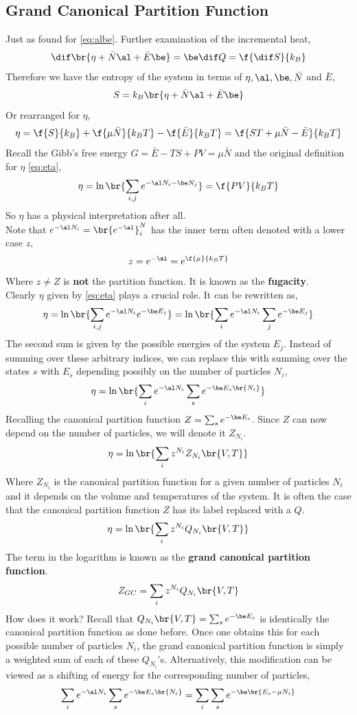 \documentclass{article}
\begin{document}
{\subsection{Grand Canonical Partition Function}
Just as found for \eqref{eq:albe}. Further examination of the incremental heat,
\[ \dif \br{\eta + \bar{N} \al + \bar{E} \be} = \be\dif Q = \f{\dif S}{k_B} \]
Therefore we have the entropy of the system in terms of $\eta, \al, \be, \bar{N}$ and $\bar{E}$,
\[ S = k_B \br{\eta + \bar{N} \al + \bar{E} \be} \]
Or rearranged for $\eta$,
\[ \eta = \f{S}{k_B} + \f{\mu\bar{N}}{k_B T} - \f{\bar{E}}{k_BT} = \f{ST + \mu\bar{N} - \bar{E}}{k_BT} \]
Recall the Gibb's free energy $G = \bar{E} - TS + PV = \mu \bar{N}$ and the original definition for $\eta$ \eqref{eq:eta},
\[ \eta = \ln \br{\sum_{i,j} e^{-\al N_i - \be N_j}} = \f{PV}{k_B T} \]
So $\eta$ has a physical interpretation after all. \\

Note that $e^{-\al N_i} = \br{e^{-\al}}^N_i$ has the inner term often denoted with a lower case $z$,
\[ z = e^{-\al} = e^{\f{\mu}{k_B T}}\]
Where $z \neq Z$ is \textbf{not} the partition function. It is known as the \textbf{fugacity}. \\

Clearly $\eta$ given by \eqref{eq:eta} plays a crucial role. It can be rewritten as,
\[ \eta  = \ln \br{\sum_{i,j} e^{-\al N_i} e^{-\be E_j}}  = \ln \br{\sum_{i} e^{-\al N_i} \sum_{j}e^{-\be E_j}} \]
The second sum is given by the possible energies of the system $E_j$. Instead of summing over these arbitrary indices, we can replace this with summing over the states $s$ with $E_s$ depending possibly on the number of particles $N_i$,
\[ \eta  = \ln \br{\sum_{i} e^{-\al N_i} \sum_{s}e^{-\be E_s\br{N_i}}} \]
Recalling the canonical partition function $Z = \sum_s e^{-\be E_s}$. Since $Z$ can now depend on the number of particles, we will denote it $Z_{N_i}$.
\[ \eta  = \ln \br{\sum_{i}z^{N_i} Z_{N_i} \br{V,T}} \]
Where $Z_{N_i}$ is the canonical partition function for a given number of particles $N_i$ and it depends on the volume and temperatures of the system. It is often the case that the canonical partition function $Z$ has its label replaced with a $Q$.
\[ \eta  = \ln \br{\sum_{i} z^{N_i} Q_{N_i} \br{V,T}} \]
The term in the logarithm is known as the \textbf{grand canonical partition function}.
\[ Z_{GC} = \sum_{i} z^{N_i} Q_{N_i} \br{V,T} \]
How does it work? Recall that $Q_{N_i} \br{V,T} = \sum_s e^{-\be E_s}$ is identically the canonical partition function as done before. Once one obtains this for each possible number of particles $N_i$, the grand canonical partition function is simply a weighted sum of each of these $Q_{N_i}$'s. Alternatively, this modification can be viewed as a shifting of energy for the corresponding number of particles,
\[ \sum_{i} e^{-\al N_i} \sum_{s}e^{-\be E_s\br{N_i}} = \sum_{i} \sum_{s}e^{-\be\br{E_s - \mu N_i}} \]

}
\end{document}
